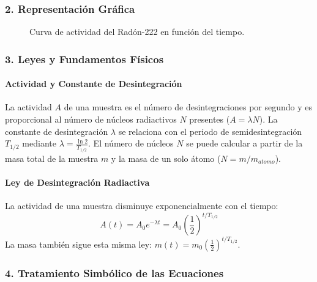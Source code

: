 \subsubsection*{2. Representación Gráfica}
\begin{figure}[H]
    \centering
    \caption{Curva de actividad del Radón-222 en función del tiempo.}
\end{figure}

\subsubsection*{3. Leyes y Fundamentos Físicos}
\paragraph*{Actividad y Constante de Desintegración}
La actividad $A$ de una muestra es el número de desintegraciones por segundo y es proporcional al número de núcleos radiactivos $N$ presentes ($A = \lambda N$). La constante de desintegración $\lambda$ se relaciona con el periodo de semidesintegración $T_{1/2}$ mediante $\lambda = \frac{\ln 2}{T_{1/2}}$. El número de núcleos $N$ se puede calcular a partir de la masa total de la muestra $m$ y la masa de un solo átomo ($N=m/m_{atomo}$).

\paragraph*{Ley de Desintegración Radiactiva}
La actividad de una muestra disminuye exponencialmente con el tiempo:
$$ A(t) = A_0 e^{-\lambda t} = A_0 \left(\frac{1}{2}\right)^{t/T_{1/2}} $$
La masa también sigue esta misma ley: $m(t) = m_0 \left(\frac{1}{2}\right)^{t/T_{1/2}}$.

\subsubsection*{4. Tratamiento Simbólico de las Ecuaciones}
